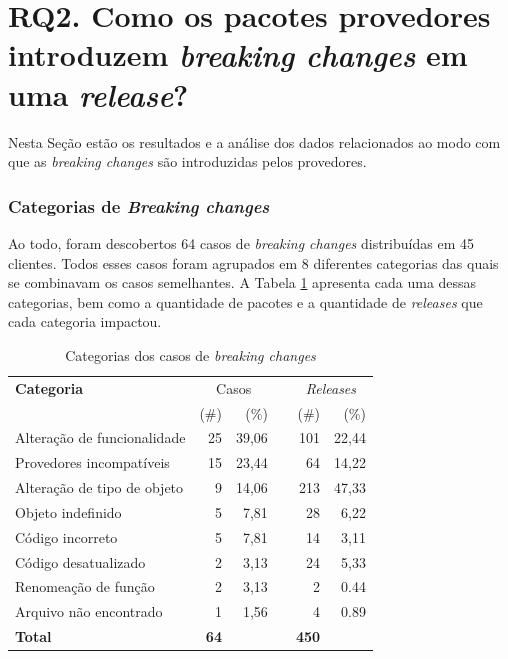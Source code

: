 \section{RQ2. Como os pacotes provedores introduzem \textit{breaking changes} em uma \textit{release}?}
\label{sec:qp2:results}
Nesta Seção estão os resultados e a análise dos dados relacionados ao modo com que as \textit{breaking changes} são introduzidas pelos provedores.

\subsubsection{Categorias de \textit{Breaking changes}}

Ao todo, foram descobertos 64 casos de \textit{breaking changes} distribuídas em 45 clientes. Todos esses casos foram agrupados em 8 diferentes categorias das quais se combinavam os casos semelhantes. A Tabela \ref{tab:bc_category} apresenta cada uma dessas categorias, bem como a quantidade de pacotes e a quantidade de \textit{releases} que cada categoria impactou.

\begin{table}\centering
	\begin{tabular}{lrrrrr} \toprule
		\textbf{Categoria} & \multicolumn{2}{c}{Casos} & \phantom{ab} & \multicolumn{2}{c}{\textit{Releases}}
		\\
		\cmidrule{2-3} \cmidrule{5-6}
		& (\#) & (\%) && (\#) & (\%) \\ \midrule
		Alteração de funcionalidade  & 25              & 39,06 && 101                         & 22,44 \\
		Provedores incompatíveis     & 15              & 23,44 && 64                          & 14,22 \\
		Alteração de tipo de objeto  & 9               & 14,06 && 213                         & 47,33 \\
		Objeto indefinido            & 5               & 7,81  && 28                          & 6,22 \\
		Código incorreto             & 5               & 7,81  && 14                          & 3,11  \\
		Código desatualizado         & 2               & 3,13  && 24                          & 5,33 \\
		Renomeação de função         & 2               & 3,13  && 2                           & 0.44  \\
		Arquivo não encontrado       & 1               & 1,56  && 4                           & 0.89  \\ \hline
		\textbf{Total}               & \textbf{64}     &       && \textbf{450}              &       \\
		\bottomrule
	\end{tabular}
    \caption{Categorias dos casos de \textit{breaking changes}}
    \label{tab:bc_category}
\end{table}

